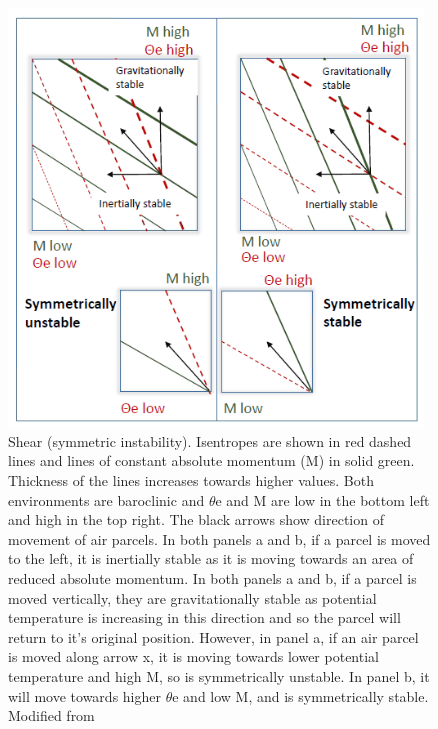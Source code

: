 \begin{figure}
	\centering	
	\includegraphics[width=26pc,angle=0]{mocrette_diagram2_screen.png}
	\caption{Shear (symmetric instability). Isentropes are shown in red dashed lines and lines of constant absolute momentum (M) in solid green. Thickness of the lines increases towards  higher values. Both environments are baroclinic and $\theta$e and M are low in the bottom left and high in the top right. The black arrows show direction of movement of air parcels. In both panels a and b, if a parcel is moved to the left, it is inertially stable as it is moving towards an area of reduced absolute momentum. In both panels a and b, if a parcel is moved vertically, they are gravitationally stable as potential temperature is increasing in this direction and so the parcel will return to it's original position. However, in panel a, if an air parcel is moved along arrow x, it is moving towards lower potential temperature and high M, so is symmetrically unstable. In panel b, it will move towards higher $\theta$e and low M, and is symmetrically stable. Modified from \cite{morcrette2004radar}}\label{fig:symm_inst}
\end{figure}


%	

